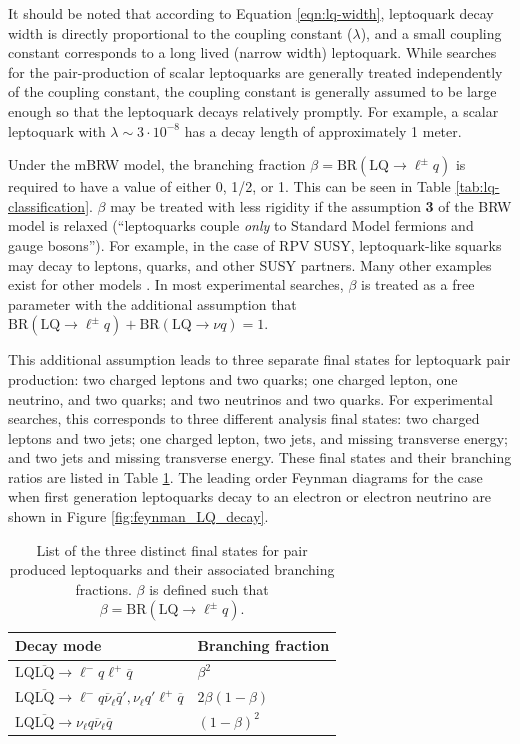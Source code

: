 It should be noted that according to Equation \ref{eqn:lq-width}, 
leptoquark decay width is directly proportional to the coupling constant ($\lambda$),
and a small coupling constant corresponds to a long lived 
(narrow width) leptoquark.  While searches for the pair-production of 
scalar leptoquarks are generally treated independently of the coupling constant,
the coupling constant is generally assumed to be large enough so that the leptoquark
decays relatively promptly.  For example, a scalar leptoquark with $\lambda \sim 3 \cdot 10^{-8}$
has a decay length of approximately 1 meter.

Under the mBRW model, the branching fraction 
$\beta = \text{BR}(\text{LQ}\rightarrow\ell^{\pm} q)$
is required to have a value of either 0, 1/2, or 1.  This
can be seen in Table \ref{tab:lq-classification}.
$\beta$ may be treated with less rigidity if the 
assumption {\bf 3} of the BRW model is relaxed
(``leptoquarks couple {\it only} to Standard Model fermions and gauge bosons'').
For example, in the case of RPV SUSY, leptoquark-like squarks 
may decay to leptons, quarks, and other SUSY partners.
Many other examples exist for other models \cite{beta-1,beta-2,beta-3}.
In most experimental searches, $\beta$ is treated as a free parameter with the additional assumption that
$\text{BR}(\text{LQ}\rightarrow\ell^{\pm} q) + \text{BR}(\text{LQ}\rightarrow\nu q) = 1$.

This additional assumption leads to three separate final
states for leptoquark pair production:
two charged leptons and two quarks; one charged lepton, one neutrino, and two quarks;
and two neutrinos and two quarks.
For experimental searches, this corresponds to three different analysis final states:
two charged leptons and two jets;
one charged lepton, two jets, and missing transverse energy;
and two jets and missing transverse energy.
These final states and their branching ratios are listed
in Table \ref{tab:lq-decay}.  The leading order 
Feynman diagrams for the case when first generation leptoquarks decay to an electron or electron neutrino
are shown in Figure \ref{fig:feynman_LQ_decay}.

\begin{table}
  \renewcommand{\arraystretch}{1.5}
  \centering
  \begin{tabular}{l|l}
    Decay mode & Branching fraction \\
    \hline\hline
    $\text{LQ}\overline{\text{LQ}} \rightarrow \ell^{-}q\ell^{+}\overline{q}$ & $\beta^2$ \\ 
    $\text{LQ}\overline{\text{LQ}} \rightarrow \ell^{-}q\overline{\nu}_{\ell}\overline{q}', \nu_{\ell} q' \ell^{+}\overline{q}$ & $2\beta(1-\beta)$ \\ 
    $\text{LQ}\overline{\text{LQ}} \rightarrow \nu_{\ell}q \overline{\nu}_{\ell}\overline{q}$ & $(1-\beta)^2$ \\ 
  \end{tabular}
  \caption{List of the three distinct final states for pair produced leptoquarks
    and their associated branching fractions.  $\beta$ is defined such that 
    $\beta = \text{BR}(\text{LQ}\rightarrow\ell^{\pm} q)$.}
  \label{tab:lq-decay}
  \renewcommand{\arraystretch}{1.0}
\end{table}


